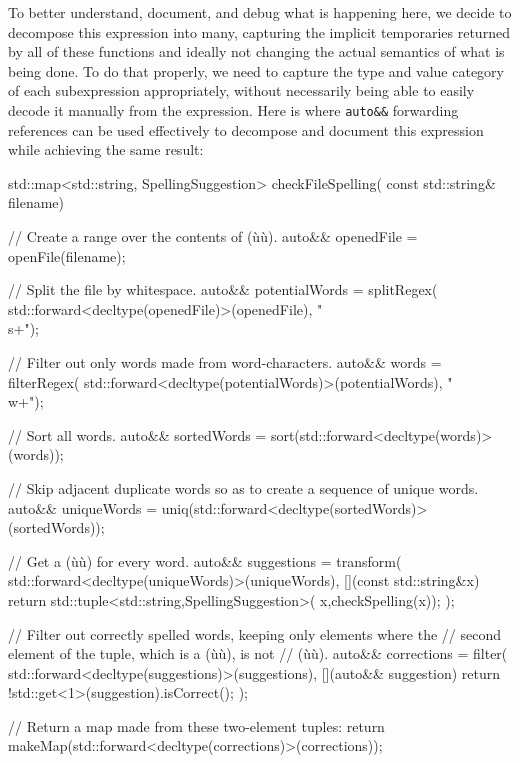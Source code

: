 To better understand, document, and debug what is happening
here, we decide to decompose this expression into many, capturing the
implicit temporaries returned by all of these functions and ideally not
changing the actual semantics of what is being done. To do that
properly, we need to capture the type and value category of each
subexpression appropriately, without necessarily being able to easily
decode it manually from the expression. Here is where \lstinline!auto&&!
forwarding references can be used effectively to decompose and document
this expression while achieving the same result:

\begin{emcppslisting}[emcppsbatch=e14]
std::map<std::string, SpellingSuggestion> checkFileSpelling(
                                                   const std::string& filename)
{
    // Create a range over the contents of (ù{}ù).
    auto&& openedFile = openFile(filename);

    // Split the file by whitespace.
    auto&& potentialWords = splitRegex(
        std::forward<decltype(openedFile)>(openedFile), "\\s+");

    // Filter out only words made from word-characters.
    auto&& words = filterRegex(
        std::forward<decltype(potentialWords)>(potentialWords), "\\w+");

    // Sort all words.
    auto&& sortedWords = sort(std::forward<decltype(words)>(words));

    // Skip adjacent duplicate words so as to create a sequence of unique words.
    auto&& uniqueWords = uniq(std::forward<decltype(sortedWords)>(sortedWords));

    // Get a (ù{}ù) for every word.
    auto&& suggestions = transform(
        std::forward<decltype(uniqueWords)>(uniqueWords),
        [](const std::string&x) {
            return std::tuple<std::string,SpellingSuggestion>(
                x,checkSpelling(x));
        });

    // Filter out correctly spelled words, keeping only elements where the
    // second element of the tuple, which is a (ù{}ù), is not
    // (ù{}ù).
    auto&& corrections = filter(
        std::forward<decltype(suggestions)>(suggestions),
        [](auto&& suggestion){ return !std::get<1>(suggestion).isCorrect(); });

    // Return a map made from these two-element tuples:
    return makeMap(std::forward<decltype(corrections)>(corrections));
}
\end{emcppslisting}

